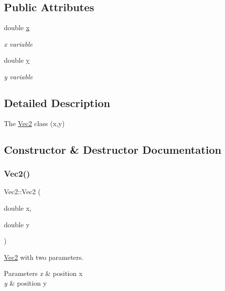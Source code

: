 \subsection*{Public Attributes}
\begin{DoxyCompactItemize}
\item 
\mbox{\label{classVec2_a0ee7118259bcfc2fe997d4bf816ed682}} 
double \hyperlink{classVec2_a0ee7118259bcfc2fe997d4bf816ed682}{x}
\begin{DoxyCompactList}\small\item\em x variable \end{DoxyCompactList}\item 
\mbox{\label{classVec2_a9c6f37b5242919bccff799c8f05dee55}} 
double \hyperlink{classVec2_a9c6f37b5242919bccff799c8f05dee55}{y}
\begin{DoxyCompactList}\small\item\em y variable \end{DoxyCompactList}\end{DoxyCompactItemize}


\subsection{Detailed Description}
The \hyperlink{classVec2}{Vec2} class (x,y) 

\subsection{Constructor \& Destructor Documentation}
\mbox{\label{classVec2_a01363a5456ac9b4a9b92cb6b7d7eb82a}} 
\subsubsection{\texorpdfstring{Vec2()}{Vec2()}}
{\footnotesize\ttfamily Vec2\+::\+Vec2 (\begin{DoxyParamCaption}\item[{double}]{x,  }\item[{double}]{y }\end{DoxyParamCaption})}



\hyperlink{classVec2}{Vec2} with two parameters. 


\begin{DoxyParams}{Parameters}
{\em x} & position x \\
\hline
{\em y} & position y \\
\hline
\end{DoxyParams}


